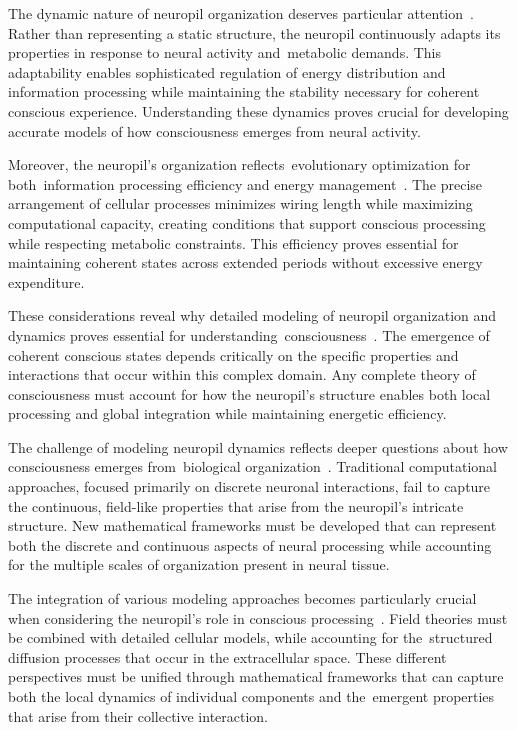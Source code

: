 The dynamic nature of neuropil organization deserves particular attention~\cite{Sorra2000, London2005}. Rather than representing a static structure, the neuropil continuously adapts its properties in response to neural activity and~metabolic demands. This adaptability enables sophisticated regulation of energy distribution and information processing while maintaining the stability necessary for coherent conscious experience. Understanding these dynamics proves crucial for developing accurate models of how consciousness emerges from neural activity.

Moreover, the neuropil's organization reflects~evolutionary optimization for both~information processing efficiency and energy management~\cite{Peters1991, bullmore2012economy}. The precise arrangement of cellular processes minimizes wiring length while maximizing computational capacity, creating conditions that support conscious processing while respecting metabolic constraints. This efficiency proves essential for maintaining coherent states across extended periods without excessive energy expenditure.

These considerations reveal why detailed modeling of neuropil organization and dynamics proves essential for understanding~consciousness~\cite{Mishchenko2010, breakspear2005dynamics}. The emergence of coherent conscious states depends critically on the specific properties and interactions that occur within this complex domain. Any complete theory of consciousness must account for how the neuropil's structure enables both local processing and global integration while maintaining energetic efficiency.

The challenge of modeling neuropil dynamics reflects deeper questions about how consciousness emerges from~biological organization~\cite{Denk2004, Hameroff2014}. Traditional computational approaches, focused primarily on discrete neuronal interactions, fail to capture the continuous, field-like properties that arise from the neuropil's intricate structure. New mathematical frameworks must be developed that can represent both the discrete and continuous aspects of neural processing while accounting for the multiple scales of organization present in neural tissue.

The integration of various modeling approaches becomes particularly crucial when considering the neuropil's role in conscious processing~\cite{Haehn2014, Helmstaedter2013}. Field theories must be combined with detailed cellular models, while accounting for the~structured diffusion processes that occur in the extracellular space. These different perspectives must be unified through mathematical frameworks that can capture both the local dynamics of individual components and the~emergent properties that arise from their collective interaction.

